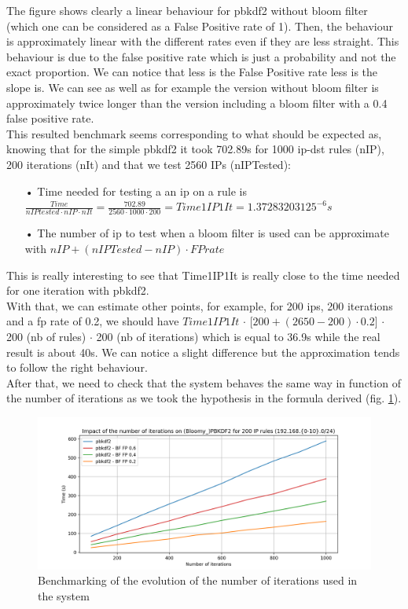 \documentclass{eplmastersthesis}
\begin{document}
The figure shows clearly a linear behaviour for \gls{pbkdf2} without bloom filter (which one can be considered as a False Positive rate of 1). Then, the behaviour is approximately linear with the different rates even if they are less straight. This behaviour is due to the false positive rate which is just a probability and not the exact proportion. We can notice that less is the False Positive rate less is the slope is.
We can see as well as for example the version without bloom filter is approximately twice longer than the version including a bloom filter with a 0.4 false positive rate.\\

This resulted benchmark seems corresponding to what should be expected as, knowing that for the simple \gls{pbkdf2} it took 702.89s for 1000 ip-dst rules (nIP), 200 iterations (nIt) and that we test 2560 IPs (nIPTested):
\begin{itemize}
\item[•] Time needed for testing a an \gls{ip} on a rule is $\frac{Time}{nIPtested \cdot nIP \cdot nIt}=\frac{702.89}{2560\cdot 1000 \cdot 200} = Time1IP1It = 1.37283203125^{-6}s$
\item[•] The number of \gls{ip} to test when a bloom filter is used can be approximate with $nIP + (nIPTested - nIP) \cdot FPrate$
\end{itemize}
This is really interesting to see that Time1IP1It is really close to the time needed for one iteration with \gls{pbkdf2}.\\

With that, we can estimate other points, for example, for 200 \glspl{ip}, 200 iterations and a \gls{fp} rate of 0.2, we should have $Time1IP1It$ $\cdot$  [$200 + (2650 - 200)\cdot 0.2$] $\cdot$ 200 (nb of rules) $\cdot$ 200 (nb of iterations) which is equal to 36.9s while the real result is about 40s. We can notice a slight difference but the approximation tends to follow the right behaviour.\\

After that, we need to check that the system behaves the same way in function of the number of iterations as we took the hypothesis in the formula derived (fig. \ref{benchmarking:timeiterations}). 

\begin{figure}[h!]
\begin{center}
	\includegraphics[scale=0.6]{res/TimeIterations}
	\caption{Benchmarking of the evolution of the number of iterations used in the system}
	\label{benchmarking:timeiterations}
\end{center}
\end{figure}
\end{document}
